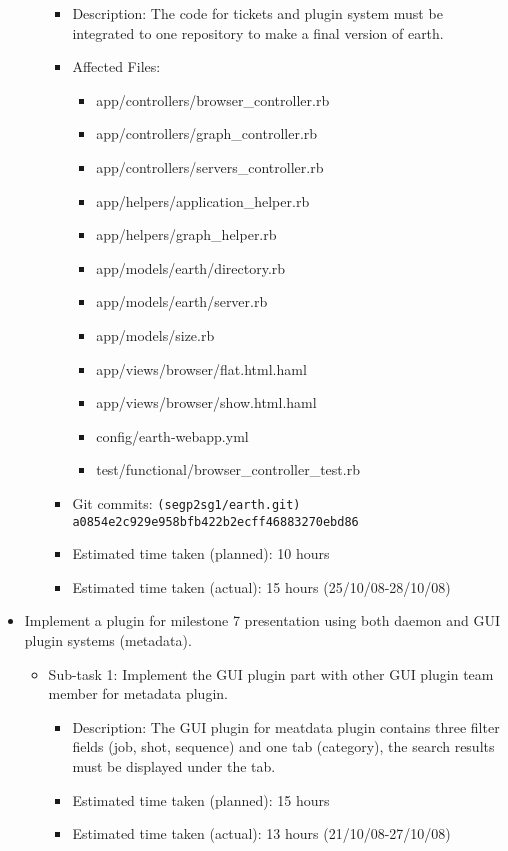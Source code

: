 \begin{itemize}
\begin{itemize}
                \begin{itemize}
                    \item Description: The code for tickets and plugin system must be integrated to one repository to make a final version of earth.
		    \item Affected Files:
                	\begin{itemize}
				\item app/controllers/browser\_controller.rb
				\item app/controllers/graph\_controller.rb
				\item app/controllers/servers\_controller.rb
				\item app/helpers/application\_helper.rb
				\item app/helpers/graph\_helper.rb
				\item app/models/earth/directory.rb
				\item app/models/earth/server.rb
				\item app/models/size.rb
				\item app/views/browser/flat.html.haml
				\item app/views/browser/show.html.haml
				\item config/earth-webapp.yml
				\item test/functional/browser\_controller\_test.rb	
                	\end{itemize}
		    \item Git commits: \texttt{(segp2sg1/earth.git) a0854e2c929e958bfb422b2ecff46883270ebd86}
                    \item Estimated time taken (planned): 10 hours
                    \item Estimated time taken (actual): 15 hours (25/10/08-28/10/08)
                \end{itemize}
        \end{itemize}
  \item Implement a plugin for milestone 7 presentation using both daemon and GUI plugin systems (metadata).
        \begin{itemize}
            \item Sub-task 1: Implement the GUI plugin part with other GUI plugin team member for metadata plugin.
                \begin{itemize}
                    \item Description: The GUI plugin for meatdata plugin contains three filter fields (job, shot, sequence) and one tab (category), the search results must be displayed under the tab.
                    \item Estimated time taken (planned): 15 hours
                    \item Estimated time taken (actual):  13 hours (21/10/08-27/10/08)
                \end{itemize}
        \end{itemize}
\end{itemize}

